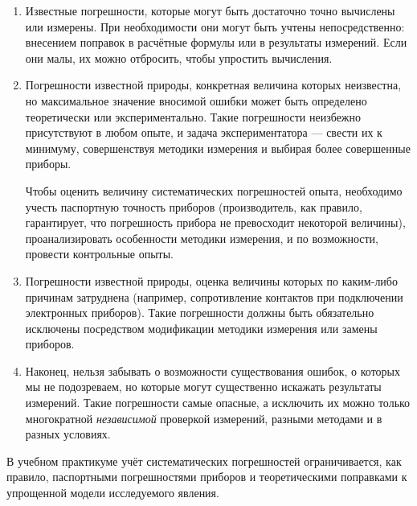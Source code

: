 \begin{enumerate}
    \item Известные погрешности, которые могут быть достаточно точно вычислены
или измерены. При необходимости они могут быть учтены непосредственно:
внесением поправок в расчётные формулы или в результаты измерений.
Если они малы, их можно отбросить, чтобы упростить вычисления.

    \item Погрешности известной природы, конкретная величина которых неизвестна,
но максимальное значение вносимой ошибки может быть определено теоретически
или экспериментально. Такие погрешности неизбежно присутствуют в любом
опыте, и задача экспериментатора --- свести их к минимуму,
совершенствуя методики измерения и выбирая более совершенные приборы.
    
    Чтобы оценить величину систематических погрешностей опыта, необходимо
учесть паспортную точность приборов (производитель, как правило, гарантирует,
что погрешность прибора не превосходит некоторой величины), проанализировать
особенности методики измерения, и по возможности, провести контрольные
опыты.

    \item Погрешности известной природы, оценка величины которых по каким-либо
причинам затруднена (например, сопротивление контактов при подключении
электронных приборов). Такие погрешности должны быть обязательно исключены
посредством модификации методики измерения или замены приборов.

    \item Наконец, нельзя забывать о возможности существования ошибок, о
которых мы не подозреваем, но которые могут существенно искажать результаты
измерений. Такие погрешности самые опасные, а исключить их можно только
многократной \emph{независимой} проверкой измерений, разными методами
и в разных условиях.
\end{enumerate}

В учебном практикуме учёт систематических погрешностей ограничивается,
как правило, паспортными погрешностями приборов и теоретическими поправками
к упрощенной модели исследуемого явления.
